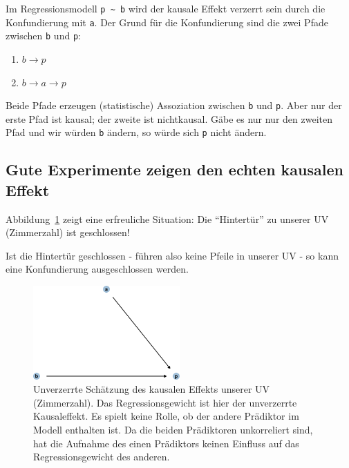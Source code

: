 \documentclass[
  a4paper,
  DIV=11]{scrreprt}
\providecommand{\tightlist}{%
  \setlength{\itemsep}{0pt}\setlength{\parskip}{0pt}}\usepackage{longtable,booktabs,array}
\theoremstyle{definition}
\theoremstyle{remark}
\begin{document}
Im Regressionsmodell \texttt{p\ \textasciitilde{}\ b} wird der kausale
Effekt verzerrt sein durch die Konfundierung mit \texttt{a}. Der Grund
für die Konfundierung sind die zwei Pfade zwischen \texttt{b} und
\texttt{p}:

\begin{enumerate}
\def\labelenumi{\arabic{enumi}.}
\tightlist
\item
  \(b \rightarrow p\)
\item
  \(b \rightarrow a \rightarrow p\)
\end{enumerate}

Beide Pfade erzeugen (statistische) Assoziation zwischen \texttt{b} und
\texttt{p}. Aber nur der erste Pfad ist kausal; der zweite ist
nichtkausal. Gäbe es nur nur den zweiten Pfad und wir würden \texttt{b}
ändern, so würde sich \texttt{p} nicht ändern.

\hypertarget{gute-experimente-zeigen-den-echten-kausalen-effekt}{%
\subsection{Gute Experimente zeigen den echten kausalen
Effekt}\label{gute-experimente-zeigen-den-echten-kausalen-effekt}}

Abbildung~\ref{fig-dag-tuer-zu} zeigt eine erfreuliche Situation: Die
``Hintertür'' zu unserer UV (Zimmerzahl) ist geschlossen!

Ist die Hintertür geschlossen - führen also keine Pfeile in unserer UV -
so kann eine Konfundierung ausgeschlossen werden.

\begin{figure}

{\centering \includegraphics[width=0.5\textwidth,height=\textheight]{./kausal_files/figure-pdf/fig-dag-tuer-zu-1.pdf}

}

\caption{\label{fig-dag-tuer-zu}Unverzerrte Schätzung des kausalen
Effekts unserer UV (Zimmerzahl). Das Regressionsgewicht ist hier der
unverzerrte Kausaleffekt. Es spielt keine Rolle, ob der andere Prädiktor
im Modell enthalten ist. Da die beiden Prädiktoren unkorreliert sind,
hat die Aufnahme des einen Prädiktors keinen Einfluss auf das
Regressionsgewicht des anderen.}

\end{figure}
\end{document}
